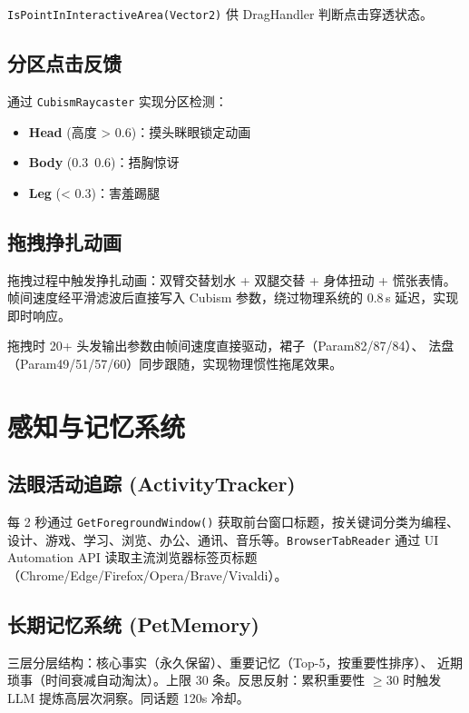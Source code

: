 \documentclass[12pt,a4paper]{ctexart}
\begin{document}
\texttt{IsPointInInteractiveArea(Vector2)} 供 DragHandler 判断点击穿透状态。

\subsection{分区点击反馈}

通过 \texttt{CubismRaycaster} 实现分区检测：

\begin{itemize}
    \item \textbf{Head} (高度 > 0.6)：摸头眯眼锁定动画
    \item \textbf{Body} (0.3~0.6)：捂胸惊讶
    \item \textbf{Leg} (< 0.3)：害羞踢腿
\end{itemize}

\subsection{拖拽挣扎动画}

拖拽过程中触发挣扎动画：双臂交替划水 + 双腿交替 + 身体扭动 + 慌张表情。
帧间速度经平滑滤波后直接写入 Cubism 参数，绕过物理系统的 0.8\,s 延迟，实现即时响应。

拖拽时 20+ 头发输出参数由帧间速度直接驱动，裙子（Param82/87/84）、
法盘（Param49/51/57/60）同步跟随，实现物理惯性拖尾效果。

\section{感知与记忆系统}

\subsection{法眼活动追踪 (ActivityTracker)}

每 2 秒通过 \texttt{GetForegroundWindow()} 获取前台窗口标题，按关键词分类为编程、
设计、游戏、学习、浏览、办公、通讯、音乐等。\texttt{BrowserTabReader} 通过
UI Automation API 读取主流浏览器标签页标题（Chrome/Edge/Firefox/Opera/Brave/Vivaldi）。

\subsection{长期记忆系统 (PetMemory)}

三层分层结构：核心事实（永久保留）、重要记忆（Top-5，按重要性排序）、
近期琐事（时间衰减自动淘汰）。上限 30 条。反思反射：累积重要性 $\geq 30$
时触发 LLM 提炼高层次洞察。同话题 120s 冷却。
\end{document}
